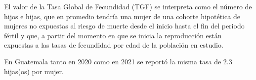 El valor de la Tasa Global de Fecundidad (TGF) se interpreta como el número de hijos e hijas, que en promedio tendría una mujer de una cohorte hipotética de mujeres no expuestas al riesgo de muerte desde el inicio hasta el fin del periodo fértil y que, a partir del momento en que se inicia la reproducción están expuestas a las tasas de fecundidad por edad de la población en estudio. 

En Guatemala tanto en 2020 como en 2021 se reportó la misma tasa de 2.3 hijas(os) por mujer.
